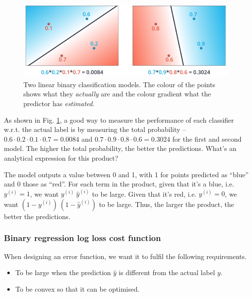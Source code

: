 \documentclass[a4paper]{article}
\begin{document}
\begin{figure}[H]
    \centering
    \includegraphics[height=4cm]{img/2_linear_models_prob.PNG}
    \caption{Two linear binary classification models. The colour of the points shows what they \textit{actually} are and the colour gradient what the predictor has \textit{estimated}.}
    \label{fig:red_blue_points_est}
\end{figure}

As shown in Fig. \ref{fig:red_blue_points_est}, a good way to measure the performance of each classifier w.r.t. the actual label is by measuring the total probability -- $0.6\cdot0.2\cdot0.1\cdot0.7=0.0084$ and $0.7\cdot0.9\cdot0.8\cdot0.6=0.3024$ for the first and second model. The higher the total probability, the better the predictions. What's an analytical expression for this product?

The model outputs a value between 0 and 1, with 1 for points predicted as ``blue'' and 0 those as ``red''. For each term in the product, given that it's a blue, i.e. $y^{(i)}=1$, we want $y^{(i)} \ \hat{y}^{(i)}$ to be large. Given that it's red, i.e. $y^{(i)}=0$, we want $\left( 1 - y^{(i)} \right)\  \left( 1 - \hat{y}^{(i)}\right)$ to be large. Thus, the larger the product, the better the predictions. 


\subsubsection{Binary regression log loss cost function}

When designing an error function, we want it to fulfil the following requirements.
\begin{itemize}
    \item To be large when the prediction $\hat{y}$ is different from the actual label $y$.
    \item To be convex so that it can be optimised.
\end{itemize}
\end{document}
